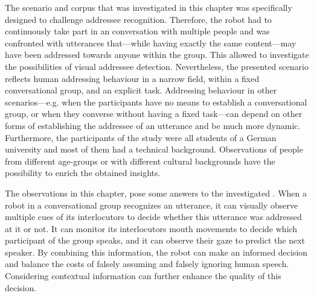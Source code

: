 The scenario and corpus that was investigated in this chapter was specifically designed to challenge  \gls{addressee} recognition.
Therefore, the \gls{robot} had to continuously take part in an \gls{conversation} with multiple people and was confronted with utterances that---while having exactly the same content---may have been addressed towards anyone within the group.
This allowed to investigate the possibilities of visual \gls{addressee} detection.
Nevertheless, the presented scenario reflects human addressing behaviour in a narrow field, within a fixed \gls{conversational group}, and an explicit task.
Addressing behaviour in other scenarios---e.g. when the participants have no means to establish a \gls{conversational group}, or when they converse without having a fixed task---can depend on other forms of establishing the \gls{addressee} of an utterance and be much more dynamic.
Furthermore, the participants of the study were all students of a German university and most of them had a technical background.
Observations of people from different age-groups or with different cultural backgrounds have the possibility to enrich the obtained insights.

The observations in this chapter, pose some answers to the investigated .
When a \gls{robot} in a \gls{conversational group} recognizes an utterance, it can visually observe multiple cues of its interlocutors to decide whether this utterance was addressed at it or not.
It can monitor its interlocutors mouth movements to decide which participant of the group speaks, and it can observe their gaze to predict the next \gls{speaker}.
By combining this information, the \gls{robot} can make an informed decision and balance the costs of falsely assuming and falsely ignoring human speech.
Considering contextual information can further enhance the quality of this decision.
